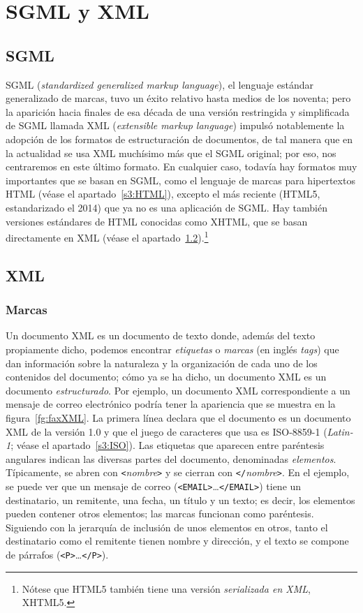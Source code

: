 \section{SGML y XML} \label{s3:SGML} \label{ss:SGML} 

\subsection{SGML} SGML (\emph{standardized generalized markup language}), el lenguaje estándar generalizado de marcas, tuvo un éxito relativo hasta medios de los noventa; pero la aparición hacia finales de esa década de una versión restringida y simplificada de SGML llamada XML (\emph{extensible markup language}) impulsó notablemente la adopción de los formatos de estructuración de documentos, de tal manera que en la actualidad se usa XML muchísimo más que el SGML original; por eso, nos centraremos en este último formato. En cualquier caso, todavía hay formatos muy importantes que se basan en SGML, como el lenguaje de marcas para hipertextos HTML (véase el apartado~\ref{s3:HTML}), excepto el más reciente (HTML5, estandarizado el 2014) que ya no es una aplicación de SGML. Hay también versiones estándares de HTML conocidas como XHTML, que se basan directamente en XML (véase el apartado~\ref{s3:XML}).\footnote{Nótese que HTML5 también tiene una versión \emph{serializada en XML}, XHTML5.} 

\subsection{XML} \label{s3:XML} 

\subsubsection{Marcas} Un documento XML es un documento de texto donde, además del texto propiamente dicho, podemos encontrar \emph{etiquetas} o \emph{marcas} (en inglés \emph{tags}) que dan información sobre la naturaleza y la organización de cada uno de los contenidos del documento; cómo ya se ha dicho, un documento XML es un documento \emph{estructurado}. Por ejemplo, un documento XML correspondiente a un mensaje de correo electrónico podría tener la apariencia que se muestra en la figura~\ref{fg:faxXML}. La primera línea declara que el documento es un documento XML de la versión 1.0 y que el juego de caracteres que usa es ISO-8859-1 (\emph{Latin-1}; véase el apartado~\ref{s3:ISO}). Las etiquetas que aparecen entre paréntesis angulares indican las diversas partes del documento, denominadas \emph{elementos}. Típicamente, se abren con \texttt{<}\emph{nombre}\texttt{>} y se cierran con \texttt{</}\emph{nombre}\texttt{>}. En el ejemplo, se puede ver que un mensaje de correo (\texttt{<EMAIL>}\ldots\texttt{</EMAIL>}) tiene un destinatario, un remitente, una fecha, un título y un texto; es decir, los elementos pueden contener otros elementos; las marcas funcionan como paréntesis. Siguiendo con la jerarquía de inclusión de unos elementos en otros, tanto el destinatario como el remitente tienen nombre y dirección, y el texto se compone de párrafos (\texttt{<P>}\ldots\texttt{</P>}). 

